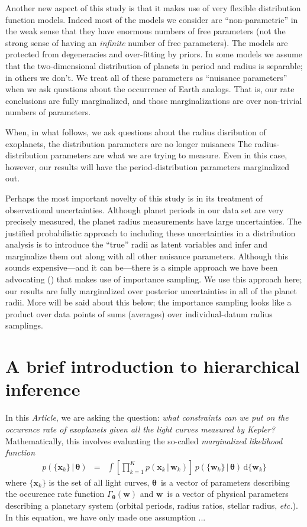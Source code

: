 \documentclass[12pt,preprint]{aastex}
\newcommand{\project}[1]{{\sffamily #1}}
\newcommand{\kepler}{\project{Kepler}}
\newcommand{\paper}{\emph{Article}}
\newcommand{\foreign}[1]{\emph{#1}}
\newcommand{\etc}{\foreign{etc.}}
\newcommand{\eqlabel}[1]{\label{eq:#1}}
\newcommand{\dd}{\ensuremath{\,\mathrm{d}}}
\newcommand{\bvec}[1]{\ensuremath{\boldsymbol{#1}}}
\newcommand{\rate}{\ensuremath{\Gamma}}
\newcommand{\ratepar}{{\ensuremath{\theta}}}
\newcommand{\ratepars}{{\ensuremath{\bvec{\ratepar}}}}
\newcommand{\data}{{\ensuremath{\bvec{x}}}}
\newcommand{\entry}{{\ensuremath{\bvec{w}}}}
\begin{document}
Another new aspect of this study is that it makes use of very flexible
distribution function models.
Indeed most of the models we consider are ``non-parametric'' in the weak sense
that they have enormous numbers of free parameters (not the strong sense of
having an \emph{infinite} number of free parameters).
The models are protected from degeneracies and over-fitting by priors.
In some models we assume that the two-dimensional distribution of planets in
period and radius is separable; in others we don't.
We treat all of these parameters as ``nuisance parameters'' when we ask
questions about the occurrence of Earth analogs.
That is, our rate conclusions are fully marginalized, and those
marginalizations are over non-trivial numbers of parameters.

When, in what follows, we ask questions about the radius disribution of
exoplanets, the distribution parameters are no longer nuisances The
radius-distribution parameters are what we are trying to measure.
Even in this case, however, our results will have the period-distribution
parameters marginalized out.

Perhaps the most important novelty of this study is in its treatment of
observational uncertainties.
Although planet periods in our data set are very precisely measured, the
planet radius measurements have large uncertainties.
The justified probabilistic approach to including these uncertainties in a
distribution analysis is to introduce the ``true'' radii as latent variables
and infer and marginalize them out along with all other nuisance parameters.
Although this sounds expensive---and it can be---there is a simple approach
we have been advocating (\cite{hogge}) that makes use of importance sampling.
We use this approach here; our results are fully marginalized over posterior
uncertainties in all of the planet radii.
More will be said about this below; the importance sampling looks like a
product over data points of sums (averages) over individual-datum radius
samplings.

\section{A brief introduction to hierarchical inference}

In this \paper, we are asking the question: \emph{what constraints can we put
on the occurence rate of exoplanets given all the light curves measured by
\kepler?}
Mathematically, this involves evaluating the so-called \emph{marginalized
likelihood function}
\begin{eqnarray}\eqlabel{crazylike}
p(\{\data_k\}\,|\,\ratepars) &=&
    \int\left[\prod_{k=1}^K p(\data_k\,|\,\entry_k)\right ]
    \,p(\{\entry_k\}\,|\,\ratepars)
    \dd\{\entry_k\}
\end{eqnarray}
where $\{\data_k\}$ is the set of all light curves, \ratepars\ is a vector of
parameters describing the occurence rate function $\rate_\ratepars(\entry)$
and \entry\ is a vector of physical parameters describing a planetary system
(orbital periods, radius ratios, stellar radius, \etc).
In this equation, we have only made one assumption ...
\end{document}

